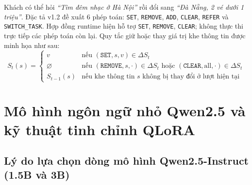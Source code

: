 Khách có thể hỏi \textit{``Tìm đêm nhạc ở Hà Nội''} rồi đổi sang \textit{``Đà Nẵng, 2 vé dưới 1 triệu''}. Đặc tả v1.2 đề xuất 6 phép toán: \texttt{SET}, \texttt{REMOVE}, \texttt{ADD}, \texttt{CLEAR}, \texttt{REFER} và \texttt{SWITCH\_TASK}. Hợp đồng runtime hiện hỗ trợ \texttt{SET}, \texttt{REMOVE}, \texttt{CLEAR}; không thực thi trực tiếp các phép toán còn lại. Quy tắc giữ hoặc thay giá trị khe thông tin được minh họa như sau:
\begin{equation}
  S_t(s) = \begin{cases}
    v & \text{nếu } (\texttt{SET}, s, v) \in \Delta S_t \\
    \varnothing & \text{nếu } (\texttt{REMOVE}, s, \cdot) \in \Delta S_t \text{ hoặc } (\texttt{CLEAR}, \text{all}, \cdot) \in \Delta S_t \\
    S_{t-1}(s) & \text{nếu khe thông tin } s \text{ không bị thay đổi ở lượt hiện tại}
  \end{cases}
  \label{eq:state_delta_transition}
\end{equation}

\section{Mô hình ngôn ngữ nhỏ Qwen2.5 và kỹ thuật tinh chỉnh QLoRA}
\label{sec:theory_qwen_qlora}

\subsection{Lý do lựa chọn dòng mô hình Qwen2.5-Instruct (1.5B và 3B)}

